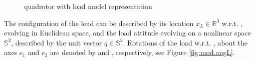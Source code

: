 \begin{figure}[h!]
	\centering
	\caption{quadrotor with load model representation\label{fig:mod.modelQRL}}
\end{figure}		

The configuration of the load can be described by its location $x_L\in \mathbb{R}^3 $ w.r.t. \IF, evolving in Euclidean space, and the load attitude evolving on a nonlinear space $ \mathbb{S}^2 $, described by the unit vector $ q\in \mathbb{S}^2 $. 
Rotations of the load w.r.t. \IF, about the axes $ e_1$ and $ e_2 $ are denoted by 
 and 
, respectively, see Figure \ref{fig:mod.angL}.\\

